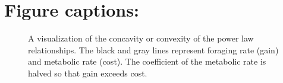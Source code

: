 \section*{Figure captions:}
\begin{figure}[H]
\begin{center}
\caption{
	A visualization of the concavity or convexity of the power law relationships.
	The black and gray lines represent foraging rate (gain) and  metabolic rate (cost).
	The coefficient of the metabolic rate is halved so that gain exceeds cost.
}
\label{fig1}
\end{center}
\end{figure}
%
